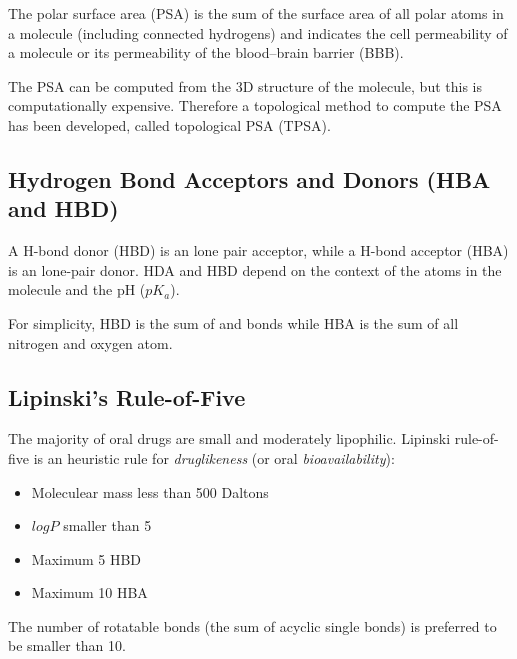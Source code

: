 The polar surface area (PSA) is the sum of the surface area of all polar atoms in a molecule (including connected hydrogens) and indicates the cell permeability of a molecule or its permeability of the blood–brain barrier (BBB).

The PSA can be computed from the 3D structure of the molecule, but this is computationally expensive. Therefore a topological method to compute the PSA has been developed, called topological PSA (TPSA).


\subsection{Hydrogen Bond Acceptors and Donors (HBA and HBD)}

A H-bond donor (HBD) is an lone pair acceptor, while a H-bond acceptor (HBA) is an lone-pair donor. HDA and HBD depend on the context of the atoms in the molecule and the pH ($pK_a$).

For simplicity, HBD is the sum of  and  bonds while HBA is the sum of all nitrogen and oxygen atom.


\subsection{Lipinski’s Rule-of-Five}

The majority of oral drugs are small and moderately lipophilic. Lipinski rule-of-five is an heuristic rule for \emph{druglikeness} (or oral \emph{bioavailability}):
\begin{itemize}
    \item Moleculear mass less than 500 Daltons
    \item $log P$ smaller than 5
    \item Maximum 5 HBD
    \item Maximum 10 HBA
\end{itemize}

The number of rotatable bonds (the sum of acyclic single bonds) is preferred to be smaller than 10.

